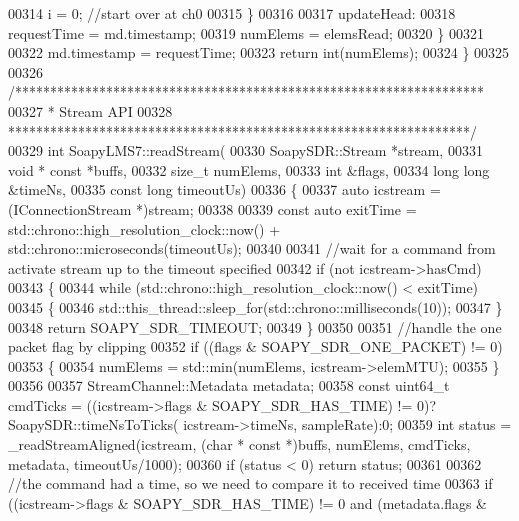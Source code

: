 \begin{DoxyCode}
00314             i = 0; \textcolor{comment}{//start over at ch0}
00315         \}
00316 
00317         updateHead:
00318         requestTime = md.timestamp;
00319         numElems = elemsRead;
00320     \}
00321 
00322     md.timestamp = requestTime;
00323     \textcolor{keywordflow}{return} int(numElems);
00324 \}
00325 
00326 \textcolor{comment}{/*******************************************************************}
00327 \textcolor{comment}{ * Stream API}
00328 \textcolor{comment}{ ******************************************************************/}
00329 \textcolor{keywordtype}{int} SoapyLMS7::readStream(
00330     SoapySDR::Stream *stream,
00331     \textcolor{keywordtype}{void} * \textcolor{keyword}{const} *buffs,
00332     \textcolor{keywordtype}{size\_t} numElems,
00333     \textcolor{keywordtype}{int} &flags,
00334     \textcolor{keywordtype}{long} \textcolor{keywordtype}{long} &timeNs,
00335     \textcolor{keyword}{const} \textcolor{keywordtype}{long} timeoutUs)
00336 \{
00337     \textcolor{keyword}{auto} icstream = (IConnectionStream *)stream;
00338 
00339     \textcolor{keyword}{const} \textcolor{keyword}{auto} exitTime = std::chrono::high\_resolution\_clock::now() + std::chrono::microseconds(timeoutUs);
00340 
00341     \textcolor{comment}{//wait for a command from activate stream up to the timeout specified}
00342     \textcolor{keywordflow}{if} (not icstream->hasCmd)
00343     \{
00344         \textcolor{keywordflow}{while} (std::chrono::high\_resolution\_clock::now() < exitTime)
00345         \{
00346             std::this\_thread::sleep\_for(std::chrono::milliseconds(10));
00347         \}
00348         \textcolor{keywordflow}{return} SOAPY\_SDR\_TIMEOUT;
00349     \}
00350 
00351     \textcolor{comment}{//handle the one packet flag by clipping}
00352     \textcolor{keywordflow}{if} ((flags & SOAPY\_SDR\_ONE\_PACKET) != 0)
00353     \{
00354         numElems = std::min(numElems, icstream->elemMTU);
00355     \}
00356 
00357     StreamChannel::Metadata metadata;
00358     \textcolor{keyword}{const} uint64\_t cmdTicks = ((icstream->flags & SOAPY\_SDR\_HAS\_TIME) != 0)?SoapySDR::timeNsToTicks(
      icstream->timeNs, sampleRate):0;
00359     \textcolor{keywordtype}{int} status = \_readStreamAligned(icstream, (\textcolor{keywordtype}{char} * \textcolor{keyword}{const} *)buffs, numElems, cmdTicks, metadata, 
      timeoutUs/1000);
00360     \textcolor{keywordflow}{if} (status < 0) \textcolor{keywordflow}{return} status;
00361 
00362     \textcolor{comment}{//the command had a time, so we need to compare it to received time}
00363     \textcolor{keywordflow}{if} ((icstream->flags & SOAPY\_SDR\_HAS\_TIME) != 0 and (metadata.flags & 

\end{DoxyCode}
